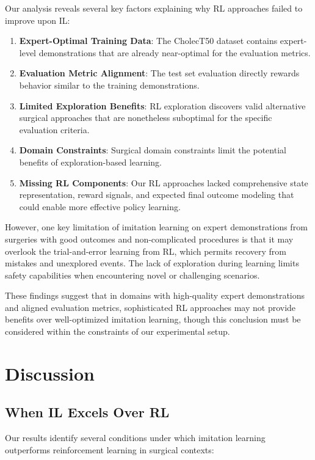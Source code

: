 \documentclass[runningheads]{llncs}
\begin{document}
Our analysis reveals several key factors explaining why RL approaches failed to improve upon IL:

\begin{enumerate}
\item \textbf{Expert-Optimal Training Data}: The CholecT50 dataset contains expert-level demonstrations that are already near-optimal for the evaluation metrics.
\item \textbf{Evaluation Metric Alignment}: The test set evaluation directly rewards behavior similar to the training demonstrations.
\item \textbf{Limited Exploration Benefits}: RL exploration discovers valid alternative surgical approaches that are nonetheless suboptimal for the specific evaluation criteria.
\item \textbf{Domain Constraints}: Surgical domain constraints limit the potential benefits of exploration-based learning.
\item \textbf{Missing RL Components}: Our RL approaches lacked comprehensive state representation, reward signals, and expected final outcome modeling that could enable more effective policy learning.
\end{enumerate}

However, one key limitation of imitation learning on expert demonstrations from surgeries with good outcomes and non-complicated procedures is that it may overlook the trial-and-error learning from RL, which permits recovery from mistakes and unexplored events. The lack of exploration during learning limits safety capabilities when encountering novel or challenging scenarios.

These findings suggest that in domains with high-quality expert demonstrations and aligned evaluation metrics, sophisticated RL approaches may not provide benefits over well-optimized imitation learning, though this conclusion must be considered within the constraints of our experimental setup.


\section{Discussion}

\subsection{When IL Excels Over RL}

Our results identify several conditions under which imitation learning outperforms reinforcement learning in surgical contexts:
\end{document}
